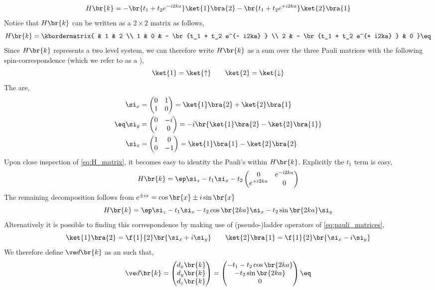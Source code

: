 \documentclass{article}
\newcommand{\uu}{\uparrow}
\newcommand{\dd}{\downarrow}
\begin{document}
\[ H\br{k} = - \br{t_1 + t_2 e^{- i2ka} }\ket{1}\bra{2} - \br{t_1 + t_2 e^{+ i2ka} }\ket{2}\bra{1} \]
Notice that $H\br{k}$ can be written as a $2\times 2$ matrix as follows,
\[ H\br{k} = \kbordermatrix{ & 1 & 2 \\ 1 & 0 & - \br{t_1 + t_2 e^{- i2ka} } \\ 2 & - \br{t_1 + t_2 e^{+ i2ka} } & 0 } \eq \label{eq:H_matrix}\]
Since $H\br{k}$ represents a two level system, we can therefore write $H\br{k}$ as a sum over the three Pauli matrices with the following spin-correspondence (which we refer to as a ),
\[ \ket{1} = \ket{\uu} \qquad \ket{2} = \ket{\dd} \]
The  are,
\begin{align*}
\eq \label{eq:pauli_matrices}
\begin{split}
\si_x &= \begin{pmatrix} 0 & 1 \\ 1 & 0 \end{pmatrix} = \ket{1} \bra{2} + \ket{2} \bra{1} \\
\si_y &= \begin{pmatrix} 0 & -i \\ i & 0 \end{pmatrix} = -i\br{\ket{1} \bra{2} - \ket{2} \bra{1}} \\
\si_z &= \begin{pmatrix} 1 & 0 \\ 0 & -1 \end{pmatrix} = \ket{1} \bra{1} - \ket{2} \bra{2}
\end{split}
\end{align*}
Upon close inspection of \cref{eq:H_matrix}, it becomes easy to identity the Pauli's within $H\br{k}$. Explicitly the $t_1$ term is easy,
\[ H\br{k} = \ep \si_z - t_1 \si_x - t_2 \begin{pmatrix} 0 & e^{- i2ka} \\ e^{+ i2ka} & 0 \end{pmatrix}\]
The remaining decomposition follows from $e^{\pm ix} = \cos\br{x} \pm i \sin \br{x}$
\[ H\br{k} = \ep \si_z - t_1 \si_x - t_2 \cos\br{2 k a}\si_x - t_2 \sin\br{2 k a}\si_y \]
Alternatively it is possible to finding  this correspondence by making use of (pseudo-)ladder operators of \cref{eq:pauli_matrices},
\[ \ket{1}\bra{2} = \f{1}{2}\br{\si_x + i \si_y} \qquad \ket{2}\bra{1} = \f{1}{2}\br{\si_x - i \si_y} \]
We therefore define $\ve d \br{k}$ as an  such that,
\[ \ve d\br{k} = \begin{pmatrix} d_x\br{k} \\ d_y\br{k} \\ d_z\br{k} \end{pmatrix} = \begin{pmatrix} -t_1 - t_2 \cos\br{2 k a} \\ - t_2 \sin\br{2 k a} \\ 0 \end{pmatrix} \eq \label{eq:dk}\]
\end{document}
